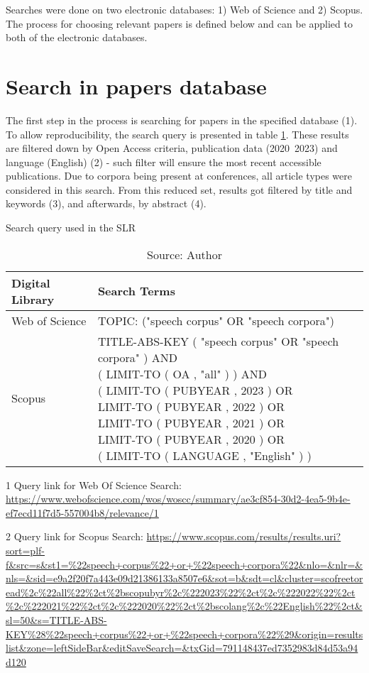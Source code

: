 Searches were done on two electronic databases: 1) Web of Science and 2) Scopus. The process for choosing relevant papers is defined below and can be applied to both of the electronic databases.

\section{Search in papers database}

The first step in the process is searching for papers in the specified database (1). To allow reproducibility, the search query is presented in table \ref{tab:search-terms}. These results are filtered down by Open Access criteria, publication data (2020~2023) and language (English) (2) - such filter will ensure the most recent accessible publications. Due to corpora being present at conferences, all article types were considered in this search. From this reduced set, results got filtered by title and keywords (3), and afterwards, by abstract (4).

\begin{table}[ht]
    \centering
    \caption{Search query used in the SLR}
    \begin{threeparttable}
      \begin{tabular}{|l|l|}
        \hline
        Digital Library & Search Terms \\ \hline
        Web of Science & TOPIC: ("speech corpus" OR "speech corpora")\tnote{1} \\ \hline
        Scopus & 
        \makecell[l]{TITLE-ABS-KEY ( "speech corpus"  OR  "speech corpora" ) AND \\
(  LIMIT-TO ( OA ,  "all" ) ) AND \\
( LIMIT-TO ( PUBYEAR ,  2023 ) OR \\
LIMIT-TO ( PUBYEAR ,  2022 ) OR \\
LIMIT-TO ( PUBYEAR ,  2021 ) OR \\
LIMIT-TO ( PUBYEAR ,  2020 ) OR \\
( LIMIT-TO ( LANGUAGE ,  "English" ) )\tnote{2}} \\ \hline
      \end{tabular}
      \begin{tablenotes}
        \footnotesize
        \item[1] Query link for Web Of Science Search: \url{https://www.webofscience.com/wos/woscc/summary/ae3cf854-30d2-4ea5-9b4e-ef7ecd11f7d5-557004b8/relevance/1}
        \item[2] Query link for Scopus Search: \url{https://www.scopus.com/results/results.uri?sort=plf-f&src=s&st1=%22speech+corpus%22+or+%22speech+corpora%22&nlo=&nlr=&nls=&sid=e9a2f20f7a443e09d21386133a8507e6&sot=b&sdt=cl&cluster=scofreetoread%2c%22all%22%2ct%2bscopubyr%2c%222023%22%2ct%2c%222022%22%2ct%2c%222021%22%2ct%2c%222020%22%2ct%2bscolang%2c%22English%22%2ct&sl=50&s=TITLE-ABS-KEY%28%22speech+corpus%22+or+%22speech+corpora%22%29&origin=resultslist&zone=leftSideBar&editSaveSearch=&txGid=791148437ed7352983d84d53a94d120}
      \end{tablenotes}
    \end{threeparttable}
    \caption*{Source: Author}
    \label{tab:search-terms}
\end{table}

